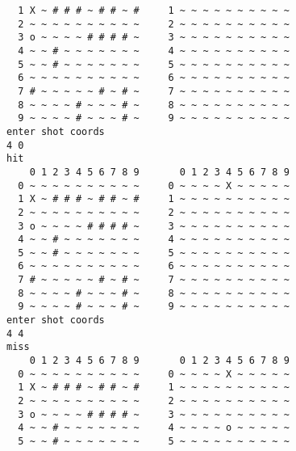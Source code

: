 \documentclass[12pt]{article}
\begin{document}
\begin{lstlisting}
  1 X ~ # # # ~ # # ~ #     1 ~ ~ ~ ~ ~ ~ ~ ~ ~ ~                               
  2 ~ ~ ~ ~ ~ ~ ~ ~ ~ ~     2 ~ ~ ~ ~ ~ ~ ~ ~ ~ ~                              
  3 o ~ ~ ~ ~ # # # # ~     3 ~ ~ ~ ~ ~ ~ ~ ~ ~ ~                              
  4 ~ ~ # ~ ~ ~ ~ ~ ~ ~     4 ~ ~ ~ ~ ~ ~ ~ ~ ~ ~                              
  5 ~ ~ # ~ ~ ~ ~ ~ ~ ~     5 ~ ~ ~ ~ ~ ~ ~ ~ ~ ~                              
  6 ~ ~ ~ ~ ~ ~ ~ ~ ~ ~     6 ~ ~ ~ ~ ~ ~ ~ ~ ~ ~                              
  7 # ~ ~ ~ ~ ~ # ~ # ~     7 ~ ~ ~ ~ ~ ~ ~ ~ ~ ~                             
  8 ~ ~ ~ ~ # ~ ~ ~ # ~     8 ~ ~ ~ ~ ~ ~ ~ ~ ~ ~                            
  9 ~ ~ ~ ~ # ~ ~ ~ # ~     9 ~ ~ ~ ~ ~ ~ ~ ~ ~ ~                               
enter shot coords                                                              
4 0                                                                            
hit                                                                            
    0 1 2 3 4 5 6 7 8 9       0 1 2 3 4 5 6 7 8 9                               
  0 ~ ~ ~ ~ ~ ~ ~ ~ ~ ~     0 ~ ~ ~ ~ X ~ ~ ~ ~ ~                               
  1 X ~ # # # ~ # # ~ #     1 ~ ~ ~ ~ ~ ~ ~ ~ ~ ~                               
  2 ~ ~ ~ ~ ~ ~ ~ ~ ~ ~     2 ~ ~ ~ ~ ~ ~ ~ ~ ~ ~                               
  3 o ~ ~ ~ ~ # # # # ~     3 ~ ~ ~ ~ ~ ~ ~ ~ ~ ~                               
  4 ~ ~ # ~ ~ ~ ~ ~ ~ ~     4 ~ ~ ~ ~ ~ ~ ~ ~ ~ ~                               
  5 ~ ~ # ~ ~ ~ ~ ~ ~ ~     5 ~ ~ ~ ~ ~ ~ ~ ~ ~ ~                               
  6 ~ ~ ~ ~ ~ ~ ~ ~ ~ ~     6 ~ ~ ~ ~ ~ ~ ~ ~ ~ ~                               
  7 # ~ ~ ~ ~ ~ # ~ # ~     7 ~ ~ ~ ~ ~ ~ ~ ~ ~ ~                               
  8 ~ ~ ~ ~ # ~ ~ ~ # ~     8 ~ ~ ~ ~ ~ ~ ~ ~ ~ ~                               
  9 ~ ~ ~ ~ # ~ ~ ~ # ~     9 ~ ~ ~ ~ ~ ~ ~ ~ ~ ~                               
enter shot coords                                                           
4 4                                                                             
miss                                                                            
    0 1 2 3 4 5 6 7 8 9       0 1 2 3 4 5 6 7 8 9                               
  0 ~ ~ ~ ~ ~ ~ ~ ~ ~ ~     0 ~ ~ ~ ~ X ~ ~ ~ ~ ~                               
  1 X ~ # # # ~ # # ~ #     1 ~ ~ ~ ~ ~ ~ ~ ~ ~ ~                               
  2 ~ ~ ~ ~ ~ ~ ~ ~ ~ ~     2 ~ ~ ~ ~ ~ ~ ~ ~ ~ ~                               
  3 o ~ ~ ~ ~ # # # # ~     3 ~ ~ ~ ~ ~ ~ ~ ~ ~ ~                               
  4 ~ ~ # ~ ~ ~ ~ ~ ~ ~     4 ~ ~ ~ ~ o ~ ~ ~ ~ ~                               
  5 ~ ~ # ~ ~ ~ ~ ~ ~ ~     5 ~ ~ ~ ~ ~ ~ ~ ~ ~ ~                               

\end{lstlisting}
\end{document}

